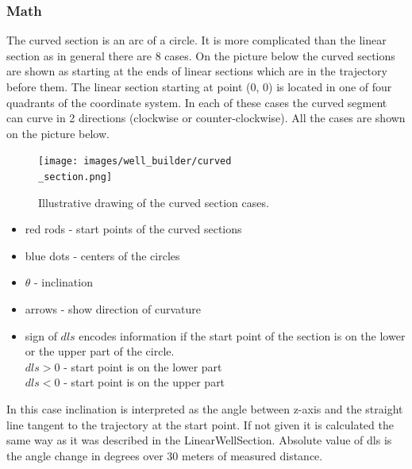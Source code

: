 \documentclass[english,10pt,a4paper]{article}
\begin{document}
	\subsubsection{Math}
	The curved section is an arc of a circle. It is more complicated than the linear section as in general there are 8 cases. On the picture below the curved sections are shown as starting at the ends of linear sections which are in the trajectory before them. The linear section starting at point (0, 0) is located in one of four quadrants of the coordinate system. In each of these cases the curved segment can curve in 2 directions (clockwise or counter-clockwise). All the cases are shown on the picture below.
	\begin{figure}[H]
		\centering
		\texttt{[image: images/well\_builder/curved\\\_section.png]}
		\caption{Illustrative drawing of the curved section cases.}
		\label{curved_section}
	\end{figure}
	\begin{itemize}
		\item red rods - start points of the curved sections
		\item blue dots - centers of the circles
		\item $\theta$ - inclination
		\item arrows - show direction of curvature
		\item sign of $dls$ encodes information if the start point of the section is on the lower or the upper part of the circle.\\
		$dls > 0$ - start point is on the lower part\\
		$dls < 0$ - start point is on the upper part\\
	\end{itemize}
	In this case inclination is interpreted as the angle between z-axis and the straight line tangent to the trajectory at the start point. If not given it is calculated the same way as it was described in the LinearWellSection. Absolute value of dls is the angle change in degrees over 30 meters of measured distance.\newline
\end{document}
